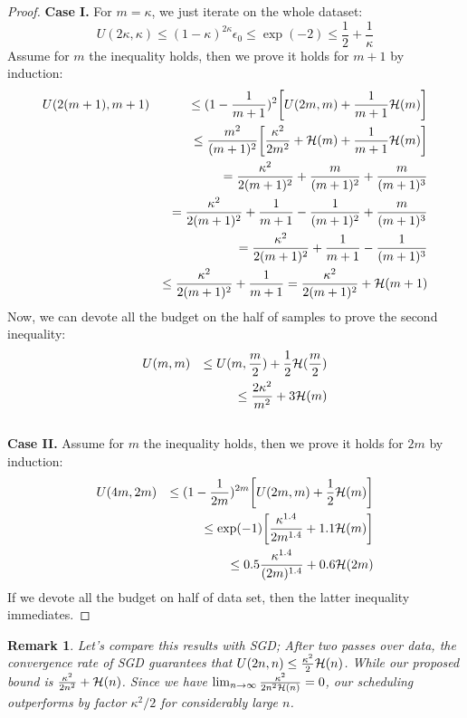 \documentclass{article}
\newtheorem{remark}[definition]{Remark}
\newcommand{\bound}{{\cal H}}
\begin{document}
\begin{proof}
    \textbf{Case I.} 
	For $m=\kappa$, we just iterate on the whole dataset: 
	\begin{equation*}
		U(2 \kappa, \kappa) \leq  (1-\kappa)^{2 \kappa} \epsilon_0 \leq \exp(-2) \leq
		\frac{1}{2} + \frac{1}{\kappa} 
	\end{equation*}
	Assume for $m$ the inequality holds, then we prove it holds for $m+1$ by
	induction: 
	\begin{eqnarray*}
		& U(2(m+1),m+1) & \leq (1-\frac{1}{m+1})^2 \bigg[ U(2m,m) + \frac{1}{m+1}
		\bound(m) \bigg] \\
		& & \leq \frac{m^2}{(m+1)^2} \bigg[ \frac{\kappa^2}{2 m^2} + \bound(m)
		+ \frac{1}{m+1} \bound(m) \bigg]
		\\
		& & = \frac{\kappa^2}{2 (m+1)^2} + \frac{m}{(m+1)^2} + \frac{m}{(m+1)^3} \\
		& & = \frac{\kappa^2}{2 (m+1)^2} + \frac{1}{m+1}- \frac{1}{(m+1)^2}+
		\frac{m}{(m+1)^3} \\ 
		& & = \frac{\kappa^2}{2 (m+1)^2} + \frac{1}{m+1} -\frac{1}{(m+1)^3} \\
		& & \leq \frac{\kappa^2}{2 (m+1)^2} + \frac{1}{m+1} = \frac{\kappa^2}{2
		(m+1)^2} + \bound(m+1)
	\end{eqnarray*}
	Now, we can devote all the budget on the half of samples to prove the second
	inequality: 
	\begin{eqnarray*}
		& U(m,m) & \leq U(m,\frac{m}{2}) + \frac{1}{2} \bound(\frac{m}{2}) \\ 
		& & \leq \frac{2\kappa^2}{m^2} + 3 \bound(m)
	\end{eqnarray*}
	\\
	\textbf{Case II.} 
	Assume for $m$ the inequality holds, then we prove it holds for $2m$ by
	induction: 
	\begin{eqnarray*}
		& U(4m,2m) & \leq (1-\frac{1}{2m})^{2m} \bigg[ U(2m,m) + \frac{1}{2}
		\bound(m) \bigg] \\
		& & \leq \exp(-1) \bigg[ \frac{\kappa^{1.4}}{2 m^{1.4}} 
		+ 1.1 \bound(m) \bigg]
		\\
		& & \leq  0.5 \frac{\kappa^{1.4}}{(2 m)^{1.4}} + 0.6 \bound(2m)
	\end{eqnarray*}
	If we devote all the budget on half of data set, then the latter
	inequality immediates.
\end{proof}
\begin{remark}
	Let's compare this results with SGD; After two passes over data, the
	convergence rate of SGD guarantees that $U(2n,n) \leq \frac{\kappa^2}{2}  \bound(n)$. While
	our proposed bound is $\frac{\kappa^2}{2n^2} + \bound(n)$. Since we have
	$\lim_{n\rightarrow \infty} \frac{\kappa^2}{2n^2\bound(n)} = 0$, our
	scheduling outperforms by factor $\kappa^2/2$ for considerably large $n$. 
\end{remark}
\end{document}

